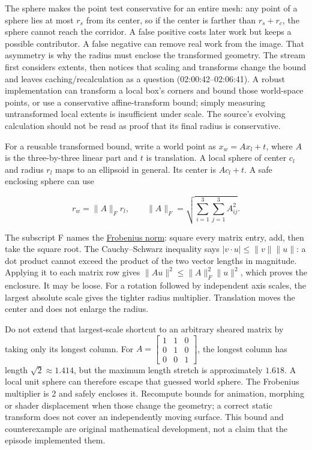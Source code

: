 The sphere makes the point test conservative for an entire mesh: any point of a sphere lies at most \(r_s\) from its center, so if the center is farther than \(r_s+r_c\), the sphere cannot reach the corridor. A false positive costs later work but keeps a possible contributor. A false negative can remove real work from the image. That asymmetry is why the radius must enclose the transformed geometry. The stream first considers extents, then notices that scaling and transforms change the bound and leaves caching/recalculation as a question (02:00:42--02:06:41). A robust implementation can transform a local box's corners and bound those world-space points, or use a conservative affine-transform bound; simply measuring untransformed local extents is insufficient under scale. The source's evolving calculation should not be read as proof that its final radius is conservative.

For a reusable transformed bound, write a world point as \(x_w=A x_l+t\), where \(A\) is the three-by-three linear part and \(t\) is translation. A local sphere of center \(c_l\) and radius \(r_l\) maps to an ellipsoid in general. Its center is \(A c_l+t\). A safe enclosing sphere can use

\[
r_w=\|A\|_F r_l,\qquad
\|A\|_F=\sqrt{\sum_{i=1}^3\sum_{j=1}^3 A_{ij}^2}.
\]

The subscript F names the \hyperref[appendix-f8657bac66e5]{Frobenius norm}: square every matrix entry, add, then take the square root. The Cauchy--Schwarz inequality says \(|v\cdot u|\leq\|v\|\|u\|\): a dot product cannot exceed the product of the two vector lengths in magnitude. Applying it to each matrix row gives \(\|Au\|^2\leq\|A\|_F^2\|u\|^2\), which proves the enclosure. It may be loose. For a rotation followed by independent axis scales, the largest absolute scale gives the tighter radius multiplier. Translation moves the center and does not enlarge the radius.

Do not extend that largest-scale shortcut to an arbitrary sheared matrix by taking only its longest column. For \(A=\begin{bmatrix}1&1&0\\0&1&0\\0&0&1\end{bmatrix}\), the longest column has length \(\sqrt2\approx1.414\), but the maximum length stretch is approximately \(1.618\). A local unit sphere can therefore escape that guessed world sphere. The Frobenius multiplier is 2 and safely encloses it. Recompute bounds for animation, morphing or shader displacement when those change the geometry; a correct static transform does not cover an independently moving surface. This bound and counterexample are original mathematical development, not a claim that the episode implemented them.

